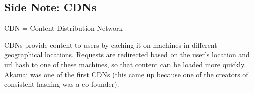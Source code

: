 \documentclass[twoside]{article}
\begin{document}
\subsection{Side Note: CDNs}
CDN = Content Distribution Network

CDNs provide content to users by caching it on machines in different geographical locations. Requests are redirected based on the user's location and url hash to one of these machines, so that content can be loaded more quickly. Akamai was one of the first CDNs (this came up because one of the creators of consistent hashing was a co-founder).
\end{document}
